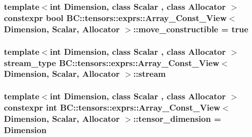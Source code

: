 \subsubsection[{\texorpdfstring{move\+\_\+constructible}{move_constructible}}]{\setlength{\rightskip}{0pt plus 5cm}template$<$int Dimension, class Scalar , class Allocator $>$ constexpr bool {\bf B\+C\+::tensors\+::exprs\+::\+Array\+\_\+\+Const\+\_\+\+View}$<$ Dimension, {\bf Scalar}, {\bf Allocator} $>$\+::move\+\_\+constructible = true\hspace{0.3cm}{\ttfamily [static]}}\hypertarget{structBC_1_1tensors_1_1exprs_1_1Array__Const__View_aad24a886f0d1cf6460591aef05e441b1}{}\label{structBC_1_1tensors_1_1exprs_1_1Array__Const__View_aad24a886f0d1cf6460591aef05e441b1}
\subsubsection[{\texorpdfstring{stream}{stream}}]{\setlength{\rightskip}{0pt plus 5cm}template$<$int Dimension, class Scalar , class Allocator $>$ {\bf stream\+\_\+type} {\bf B\+C\+::tensors\+::exprs\+::\+Array\+\_\+\+Const\+\_\+\+View}$<$ Dimension, {\bf Scalar}, {\bf Allocator} $>$\+::stream}\hypertarget{structBC_1_1tensors_1_1exprs_1_1Array__Const__View_a563db6a19ab0dd981c3d2ecf976913ea}{}\label{structBC_1_1tensors_1_1exprs_1_1Array__Const__View_a563db6a19ab0dd981c3d2ecf976913ea}
\subsubsection[{\texorpdfstring{tensor\+\_\+dimension}{tensor_dimension}}]{\setlength{\rightskip}{0pt plus 5cm}template$<$int Dimension, class Scalar , class Allocator $>$ constexpr int {\bf B\+C\+::tensors\+::exprs\+::\+Array\+\_\+\+Const\+\_\+\+View}$<$ Dimension, {\bf Scalar}, {\bf Allocator} $>$\+::tensor\+\_\+dimension = Dimension\hspace{0.3cm}{\ttfamily [static]}}\hypertarget{structBC_1_1tensors_1_1exprs_1_1Array__Const__View_a93f55387af07781120c38abbb7a89bfd}{}\label{structBC_1_1tensors_1_1exprs_1_1Array__Const__View_a93f55387af07781120c38abbb7a89bfd}

